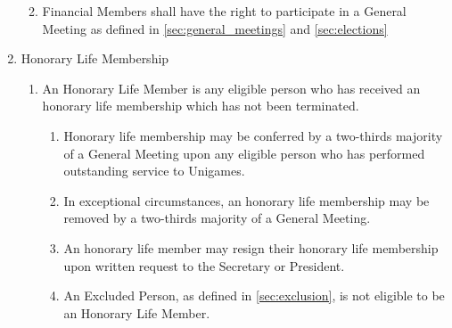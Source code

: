 \documentclass[a4paper]{article}
\begin{document}
\begin{enumerate}
\begin{enumerate}
\begin{enumerate}
                \end{enumerate}
            \item Financial Members shall have the right to participate in a General Meeting as defined in \cref{sec:general_meetings} and \cref{sec:elections}
        \end{enumerate}
    \item Honorary Life Membership
          \begin{enumerate}
              \item An Honorary Life Member is any eligible person who has received an honorary life membership which has not been terminated.
                \begin{enumerate}
                    \item Honorary life membership may be conferred by a two-thirds majority of a General Meeting upon any eligible person who has performed outstanding service to Unigames.
                    \item In exceptional circumstances, an honorary life membership may be removed by a two-thirds majority of a General Meeting.
                    \item An honorary life member may resign their honorary life membership upon written request to the Secretary or President.
                    \item An Excluded Person, as defined in \cref{sec:exclusion}, is not eligible to be an Honorary Life Member.
                \end{enumerate}
          \end{enumerate}
\end{enumerate}
\end{document}

